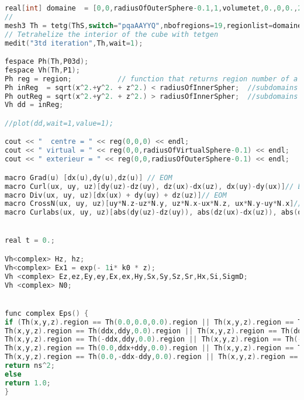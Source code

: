 \begin{lstlisting}[language=C]
real[int] domaine  = [0,0,radiusOfOuterSphere-0.1,1,volumetet,0.,0,0.,2,volumetetIn,0.,0,radiusOfVirtualSphere-0.1,3,volumetet,ddx,0,0.,4,volumetetIn,-ddx,0,0,5,volumetetIn,0,ddx,0,6,volumetetIn,0,-ddx,0,7,volumetetIn, ddx,ddy,0,8,volumetetIn,ddx,-ddy,0.,9,volumetetIn,ddx+ddy,0,0.,10,volumetetIn,-ddx,ddy,0,11,volumetetIn,-ddx,-ddy,0,12,volumetetIn,-ddx-ddy,0,0,13,volumetetIn, 0,ddx+ddy,0,14,volumetetIn, -ddy,ddx,0,15,volumetetIn, ddy,ddx,0,16,volumetetIn, 0, -ddx-ddy,0,17,volumetetIn, ddy,-ddx,0,18,volumetetIn, -ddy, -ddx,0,19,volumetetIn];
//
mesh3 Th = tetg(ThS,switch="pqaAAYYQ",nbofregions=19,regionlist=domaine);
// Tetrahelize the interior of the cube with tetgen
medit("3td iteration",Th,wait=1);

fespace Ph(Th,P03d);
fespace Vh(Th,P1);
Ph reg = region;           // function that returns region number of a point XY
Ph inReg  = sqrt(x^2.+y^2. + z^2.) < radiusOfInnerSpher;  //subdomains for inside the sratterer
Ph outReg = sqrt(x^2.+y^2. + z^2.) > radiusOfInnerSpher;  //subdomains for outside the scatterer
Vh dd = inReg;

//plot(dd,wait=1,value=1);

cout << "  centre = " << reg(0,0,0) << endl;
cout << " virtual = " << reg(0,0,radiusOfVirtualSphere-0.1) << endl;
cout << " exterieur = " << reg(0,0,radiusOfOuterSphere-0.1) << endl;

macro Grad(u) [dx(u),dy(u),dz(u)] // EOM
macro Curl(ux, uy, uz)[dy(uz)-dz(uy), dz(ux)-dx(uz), dx(uy)-dy(ux)]// EOM
macro Div(ux, uy, uz)[dx(ux) + dy(uy) + dz(uz)]// EOM
macro CrossN(ux, uy, uz)[uy*N.z-uz*N.y, uz*N.x-ux*N.z, ux*N.y-uy*N.x]// EOM
macro Curlabs(ux, uy, uz)[abs(dy(uz)-dz(uy)), abs(dz(ux)-dx(uz)), abs(dx(uy)-dy(ux))]// EOM


real t = 0.;

Vh<complex> Hz, hz;
Vh<complex> Ex1 = exp(- 1i* k0 * z);
Vh <complex> Ez,ez,Ey,ey,Ex,ex,Hy,Sx,Sy,Sz,Sr,Hx,Si,SigmD;
Vh <complex> N0;


func complex Eps() {
if (Th(x,y,z).region == Th(0.0,0.0,0.0).region || Th(x,y,z).region == Th(ddx,0.0,0.0).region || Th(x,y,z).region == Th(-ddx,0.0,0.0).region || Th(x,y,z).region == Th(0.0, ddx, 0.0).region || Th(x,y,z).region == Th(0.0,-ddx,0.0).region ||
Th(x,y,z).region == Th(ddx,ddy,0.0).region || Th(x,y,z).region == Th(ddx+ddy,0.0,0.0).region || Th(x,y,z).region == Th(ddx,-ddy,0.0).region ||
Th(x,y,z).region == Th(-ddx,ddy,0.0).region || Th(x,y,z).region == Th(-ddx-ddy,0.0,0.0).region || Th(x,y,z).region == Th(-ddx,-ddy,0.0).region ||
Th(x,y,z).region == Th(0.0,ddx+ddy,0.0).region || Th(x,y,z).region == Th(ddy,ddx,0.0).region || Th(x,y,z).region == Th(-ddy,ddx,0.0).region ||
Th(x,y,z).region == Th(0.0,-ddx-ddy,0.0).region || Th(x,y,z).region == Th(ddy,-ddx,0.0).region || Th(x,y,z).region == Th(-ddy,-ddx,0.0).region)
return ns^2;
else 
return 1.0;
}


\end{lstlisting}
